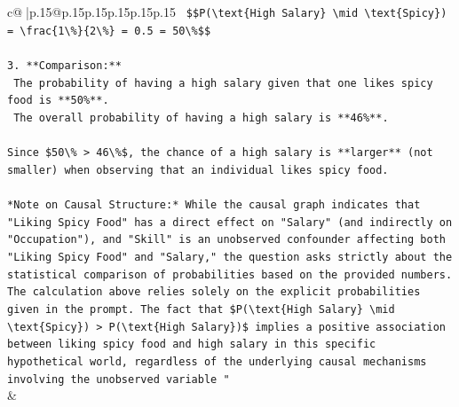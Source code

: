 \documentclass{article}
\begin{document}
{\begin{supertabular}{c@{$\;$}|p{.15\linewidth}@{}p{.15\linewidth}p{.15\linewidth}p{.15\linewidth}p{.15\linewidth}p{.15\linewidth}}
{{{\texttt{    \$\$P(\textbackslash{}text\{High Salary\} \textbackslash{}mid \textbackslash{}text\{Spicy\}) = \textbackslash{}frac\{1\textbackslash{}\%\}\{2\textbackslash{}\%\} = 0.5 = 50\textbackslash{}\%\$\$} \\
\\ 
\texttt{3.  **Comparison:**} \\
\texttt{    The probability of having a high salary given that one likes spicy food is **50\%**.} \\
\texttt{    The overall probability of having a high salary is **46\%**.} \\
\\ 
\texttt{Since \$50\textbackslash{}\% > 46\textbackslash{}\%\$, the chance of a high salary is **larger** (not smaller) when observing that an individual likes spicy food.} \\
\\ 
\texttt{*Note on Causal Structure:* While the causal graph indicates that "Liking Spicy Food" has a direct effect on "Salary" (and indirectly on "Occupation"), and "Skill" is an unobserved confounder affecting both "Liking Spicy Food" and "Salary," the question asks strictly about the statistical comparison of probabilities based on the provided numbers. The calculation above relies solely on the explicit probabilities given in the prompt. The fact that \$P(\textbackslash{}text\{High Salary\} \textbackslash{}mid \textbackslash{}text\{Spicy\}) > P(\textbackslash{}text\{High Salary\})\$ implies a positive association between liking spicy food and high salary in this specific hypothetical world, regardless of the underlying causal mechanisms involving the unobserved variable "} \\
            }
        }
    }
    & \\ \\


\end{supertabular}}
\end{document}
